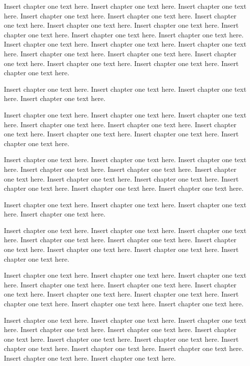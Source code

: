 Insert chapter one text here. Insert chapter one text here. Insert chapter one text here. Insert chapter one text here. Insert chapter one text here. Insert chapter one text here. Insert chapter one text here. Insert chapter one text here. Insert chapter one text here. Insert chapter one text here. Insert chapter one text here. Insert chapter one text here. Insert chapter one text here. Insert chapter one text here. Insert chapter one text here. Insert chapter one text here. Insert chapter one text here. Insert chapter one text here. Insert chapter one text here. Insert chapter one text here.

Insert chapter one text here. Insert chapter one text here. Insert chapter one text here. Insert chapter one text here. 

Insert chapter one text here. Insert chapter one text here. Insert chapter one text here. Insert chapter one text here. Insert chapter one text here. Insert chapter one text here. Insert chapter one text here. Insert chapter one text here. Insert chapter one text here.

Insert chapter one text here. Insert chapter one text here. Insert chapter one text here. Insert chapter one text here. Insert chapter one text here. Insert chapter one text here. Insert chapter one text here. Insert chapter one text here. Insert chapter one text here. Insert chapter one text here. Insert chapter one text here.

Insert chapter one text here. Insert chapter one text here. Insert chapter one text here. Insert chapter one text here. 

Insert chapter one text here. Insert chapter one text here. Insert chapter one text here. Insert chapter one text here. Insert chapter one text here. Insert chapter one text here. Insert chapter one text here. Insert chapter one text here. Insert chapter one text here.

Insert chapter one text here. Insert chapter one text here. Insert chapter one text here. Insert chapter one text here. Insert chapter one text here. Insert chapter one text here. Insert chapter one text here. Insert chapter one text here. Insert chapter one text here. Insert chapter one text here. Insert chapter one text here.

Insert chapter one text here. Insert chapter one text here. Insert chapter one text here. Insert chapter one text here. Insert chapter one text here. Insert chapter one text here. Insert chapter one text here. Insert chapter one text here. Insert chapter one text here. Insert chapter one text here. Insert chapter one text here. Insert chapter one text here. Insert chapter one text here.

